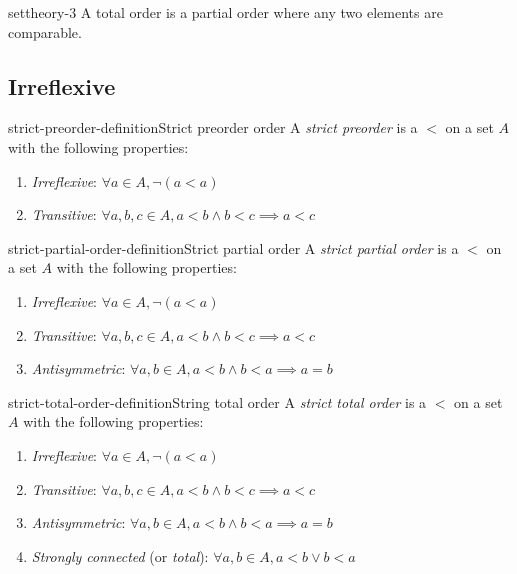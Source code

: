 \documentclass[preview]{standalone}
\begin{document}
\begin{snippet}{settheory-3}
    A total order is a partial order where any two elements are comparable.
\end{snippet}

\subsection{Irreflexive}

\begin{snippetdefinition}{strict-preorder-definition}{Strict preorder order}
    A \textit{strict preorder} is a \homrelation \(<\) on a set \(A\)
    with the following properties:
    \begin{enumerate}
        \item \textit{Irreflexive}: \(\forall a \in A, \lnot (a < a)\)
        \item \textit{Transitive}: \(\forall a,b,c \in A, a < b \land b < c \implies a < c\)
    \end{enumerate}
\end{snippetdefinition}

\begin{snippetdefinition}{strict-partial-order-definition}{Strict partial order}
    A \textit{strict partial order} is a \homrelation \(<\) on a set \(A\)
    with the following properties:
    \begin{enumerate}
        \item \textit{Irreflexive}: \(\forall a \in A, \lnot (a < a)\)
        \item \textit{Transitive}: \(\forall a,b,c \in A, a < b \land b < c \implies a < c\)
        \item \textit{Antisymmetric}: \(\forall a,b \in A, a < b \land b < a \implies a=b\)
    \end{enumerate}
\end{snippetdefinition}

\begin{snippetdefinition}{strict-total-order-definition}{String total order}
    A \textit{strict total order} is a \homrelation \(<\) on a set \(A\)
    with the following properties:
    
    \begin{enumerate}
        \item \textit{Irreflexive}: \(\forall a \in A, \lnot (a < a)\)
        \item \textit{Transitive}: \(\forall a,b,c \in A, a < b \land b < c \implies a < c\)
        \item \textit{Antisymmetric}: \(\forall a,b \in A, a < b \land b < a \implies a=b\)
        \item \textit{Strongly connected} (or \textit{total}): \(\forall a,b\in A, a < b \lor b < a\)
    \end{enumerate}
\end{snippetdefinition}
\end{document}

